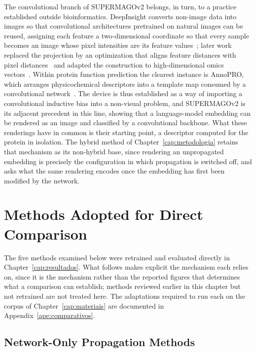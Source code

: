 \documentclass[Ingles]{ic-tese-v3}
\begin{document}
The convolutional branch of SUPERMAGOv2 belongs, in turn, to a practice established outside
bioinformatics. DeepInsight converts non-image data into images so that convolutional architectures
pretrained on natural images can be reused, assigning each feature a two-dimensional coordinate so
that every sample becomes an image whose pixel intensities are its feature
values~\cite{sharma2019deepinsight}; later work replaced the projection by an optimization that
aligns feature distances with pixel distances~\cite{zhu2021igtd} and adapted the construction to
high-dimensional omics vectors~\cite{zhu2022vec2image}. Within protein function prediction the
clearest instance is AnnoPRO, which arranges physicochemical descriptors into a template map consumed
by a convolutional network~\cite{zheng2024annopro}. The device is thus established as a way of
importing a convolutional inductive bias into a non-visual problem, and SUPERMAGOv2 is its adjacent
precedent in this line, showing that a language-model embedding can be rendered as an image and
classified by a convolutional backbone. What these renderings have in common is their starting point,
a descriptor computed for the protein in isolation. The hybrid method of
Chapter~\ref{cap:metodologia} retains that mechanism as its non-hybrid base, since rendering an
unpropagated embedding is precisely the configuration in which propagation is switched off, and asks
what the same rendering encodes once the embedding has first been modified by the network.

\section{Methods Adopted for Direct Comparison}
\label{sec:rel_comparativos}

The five methods examined below were retrained and evaluated directly in
Chapter~\ref{cap:resultados}. What follows makes explicit the mechanism each relies on, since it is
the mechanism rather than the reported figures that determines what a comparison can establish;
methods reviewed earlier in this chapter but not retrained are not treated here. The adaptations
required to run each on the corpus of Chapter~\ref{cap:materiais} are documented in
Appendix~\ref{ape:comparativos}.

\subsection{Network-Only Propagation Methods}
\label{sec:rel_redes_comp}
\end{document}
